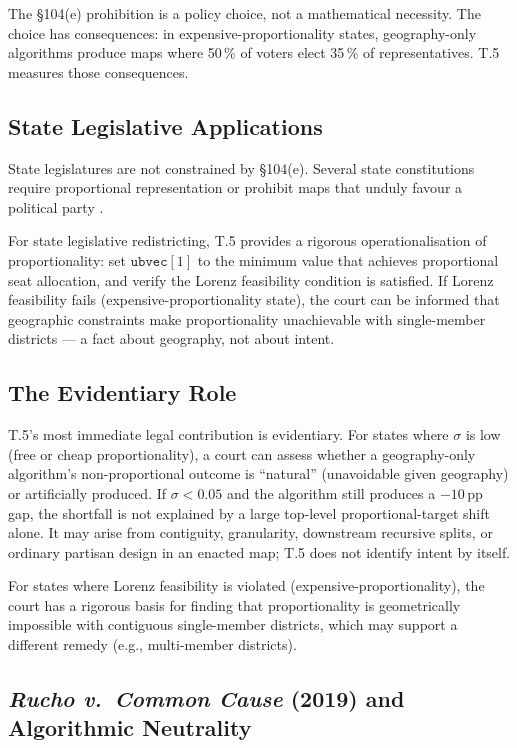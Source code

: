 The \S104(e) prohibition is a policy choice, not a mathematical necessity.
The choice has consequences: in expensive-proportionality states, geography-only
algorithms produce maps where 50\,\% of voters elect 35\,\% of representatives.
T.5 measures those consequences.

\subsection{State Legislative Applications}

State legislatures are not constrained by \S104(e).
Several state constitutions require proportional representation or prohibit
maps that unduly favour a political party \citep{lwv2018pa, harper2022nc}.

For state legislative redistricting, T.5 provides a rigorous operationalisation
of proportionality: set $\mathtt{ubvec}[1]$ to the minimum value that achieves
proportional seat allocation, and verify the Lorenz feasibility condition is
satisfied.
If Lorenz feasibility fails (expensive-proportionality state), the court can
be informed that geographic constraints make proportionality unachievable
with single-member districts --- a fact about geography, not about intent.

\subsection{The Evidentiary Role}

T.5's most immediate legal contribution is evidentiary.
For states where $\sigma$ is low (free or cheap proportionality), a court
can assess whether a geography-only algorithm's non-proportional outcome is
``natural'' (unavoidable given geography) or artificially produced.
If $\sigma < 0.05$ and the algorithm still produces a $-10$\,pp gap, the
shortfall is not explained by a large top-level proportional-target shift
alone. It may arise from contiguity, granularity, downstream recursive splits,
or ordinary partisan design in an enacted map; T.5 does not identify intent by
itself.

For states where Lorenz feasibility is violated (expensive-proportionality),
the court has a rigorous basis for finding that proportionality is geometrically
impossible with contiguous single-member districts, which may support a
different remedy (e.g., multi-member districts).

\subsection{\emph{Rucho v.\ Common Cause} (2019) and Algorithmic Neutrality}

